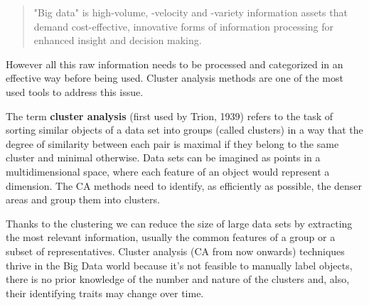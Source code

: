 \begin{quotation}
"Big data" is high-volume, -velocity and -variety information assets that demand cost-effective, innovative forms of information processing for enhanced insight and decision making.
\end{quotation}


However all this raw information needs to be processed and categorized in an effective way before being used. Cluster analysis methods are one of the most used tools to address this issue. 

The term \textbf{cluster analysis} (first used by Trion, 1939) refers to the task of sorting similar objects of a data set into groups (called clusters) in a way that the degree of similarity between each pair is maximal if they belong to the same cluster and minimal otherwise. Data sets can be imagined as points in a multidimensional space, where each feature of an object would represent a dimension. The CA methods need to identify, as efficiently as possible, the denser areas and group them into clusters.

Thanks to the clustering we can reduce the size of large data sets by extracting the most relevant information, usually the common features of a group or a subset of representatives. Cluster analysis (CA from now onwards) techniques thrive in the Big Data world because it's not feasible to manually label objects, there is no prior knowledge of the number and nature of the clusters and, also, their identifying traits may change over time. 

